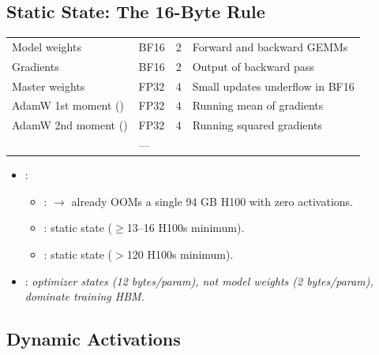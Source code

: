 \subsection{Static State: The 16-Byte Rule}

\par\vspace{4pt}\noindent\begin{minipage}{\linewidth}
\small
\begin{tabularx}{\linewidth}{@{}l l c Y@{}}
\toprule
{} &  &  &  \\
\midrule
Model weights & BF16 & 2 & Forward and backward GEMMs \\
Gradients & BF16 & 2 & Output of backward pass \\
Master weights & FP32 & 4 & Small updates underflow in BF16 \\
AdamW 1st moment () & FP32 & 4 & Running mean of gradients \\
AdamW 2nd moment () & FP32 & 4 & Running squared gradients \\
\midrule
{} & --- &  &  \\
\bottomrule
\end{tabularx}
\end{minipage}\par\vspace{4pt}

\begin{itemize}
    \item {}:
    \begin{itemize}
        \item {}:  $\rightarrow$ already OOMs a single 94 GB H100 with zero activations.
        \item {}:  static state ($\ge$13--16 H100s minimum).
        \item {}:  static state ($>$120 H100s minimum).
    \end{itemize}
    \item {}: \emph{optimizer states (12 bytes/param), not model weights (2 bytes/param), dominate training HBM.}
\end{itemize}

\subsection{Dynamic Activations}

